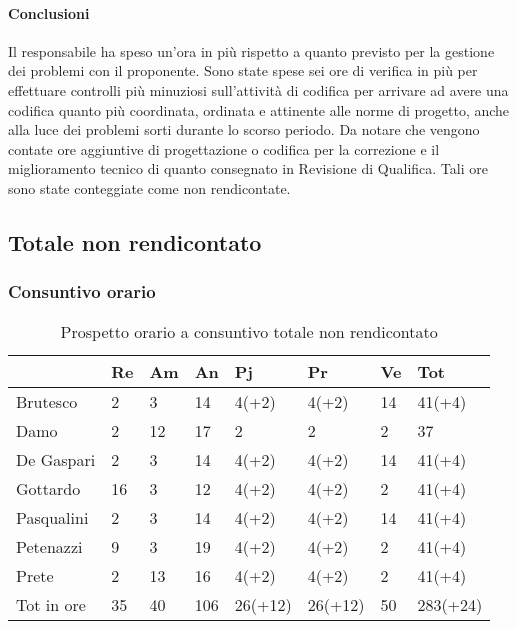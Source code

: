 		\paragraph{Conclusioni}
		Il responsabile ha speso un'ora in più rispetto a quanto previsto per la gestione dei problemi con il proponente. Sono state spese sei ore di verifica in più per effettuare controlli più minuziosi sull'attività di codifica per arrivare ad avere una codifica quanto più coordinata, ordinata e attinente alle norme di progetto, anche alla luce dei problemi sorti durante lo scorso periodo. Da notare che vengono contate ore aggiuntive di progettazione o codifica per la correzione e il miglioramento tecnico di quanto consegnato in Revisione di Qualifica. Tali ore sono state conteggiate come non rendicontate.
									\newpage
	\subsection{Totale non rendicontato}
		\subsubsection{Consuntivo orario}
						\begin{table}[h] \begin{center} \begin{tabular}{llllllll}																						
						\toprule
									&	Re		&	Am		&	An		&	Pj		&	Pr		&	Ve		&	Tot	 \\ 	
						\midrule					
						Brutesco	&	2		&	3		&	14		&	4(+2)		&	4(+2)		&	14	&	41(+4)	\\
						Damo		&	2		&	12		&	17		&	2		&	2		&	2		&	37	\\
						De Gaspari	&	2		&	3		&	14		&	4(+2)		&	4(+2)		&	14	&	41(+4)	\\
						Gottardo	&	16		&	3		&	12		&	4(+2)		&	4(+2)		&	2		&	41(+4)	\\
						Pasqualini	&	2		&	3		&	14		&	4(+2)		&	4(+2)		&	14		&	41(+4)	\\
						Petenazzi	&	9		&	3		&	19		&	4(+2)		&	4(+2)		&	2		&	41(+4)	\\
						Prete	&	2		&	13		&	16		&	4(+2)		&	4(+2)		&	2		&	41(+4)	\\
						\midrule																Tot in ore	&	35		&	40		&	106		&	26(+12)		&	26(+12)		&	50		&	283(+24)	\\						
				
					
					\bottomrule																					
																							
						\end{tabular} \end{center} \caption{Prospetto orario a consuntivo totale non rendicontato													
						}\label{tab:oreNonRend} \end{table}							
